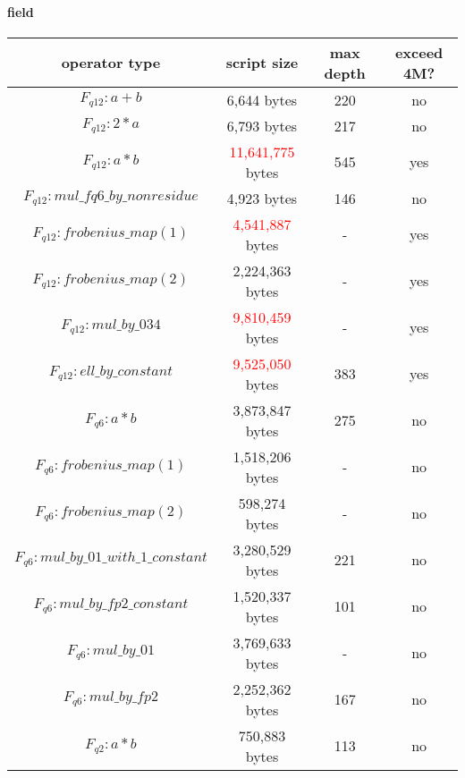 \paragraph*{field}

\begin{center}
\begin{tabular}{|c|c|c|c|} \hline
operator type & script size & max depth & exceed 4M? \\ \hline
$F_{q12}: a + b$ & 6,644 bytes & 220 & no  \\ \hline
$F_{q12}: 2 * a$ & 6,793 bytes & 217 & no \\ \hline
$F_{q12}: a * b$ & \textcolor{red}{11,641,775} bytes & 545 & yes \\ \hline
$F_{q12}: mul\_fq6\_by\_nonresidue$ & 4,923 bytes &	146 & no \\ \hline
$F_{q12}: frobenius\_map(1)$ & \textcolor{red}{4,541,887} bytes & - & yes \\ \hline
$F_{q12}: frobenius\_map(2)$ & 2,224,363 bytes & - & yes \\ \hline
$F_{q12}: mul\_by\_034$ & \textcolor{red}{9,810,459} bytes &	- & yes \\ \hline
$F_{q12}: ell\_by\_constant$ & \textcolor{red}{9,525,050} bytes & 383 & yes \\ \hline
$F_{q6}: a * b$ & 3,873,847 bytes &	275 & no \\ \hline
$F_{q6}: frobenius\_map(1)$ & 1,518,206 bytes &	- & no \\ \hline
$F_{q6}: frobenius\_map(2)$ & 598,274 bytes & - & no \\ \hline
$F_{q6}: mul\_by\_01\_with\_1\_constant$ & 3,280,529 bytes & 221 & no \\ \hline
$F_{q6}: mul\_by\_fp2\_constant$ & 1,520,337 bytes & 101 & no \\ \hline
$F_{q6}: mul\_by\_01$ & 3,769,633 bytes & - & no \\ \hline
$F_{q6}: mul\_by\_fp2$ & 2,252,362 bytes &	167 & no \\ \hline
$F_{q2}: a * b$ & 750,883 bytes & 113 & no \\ \hline

\end{tabular}
\end{center}
